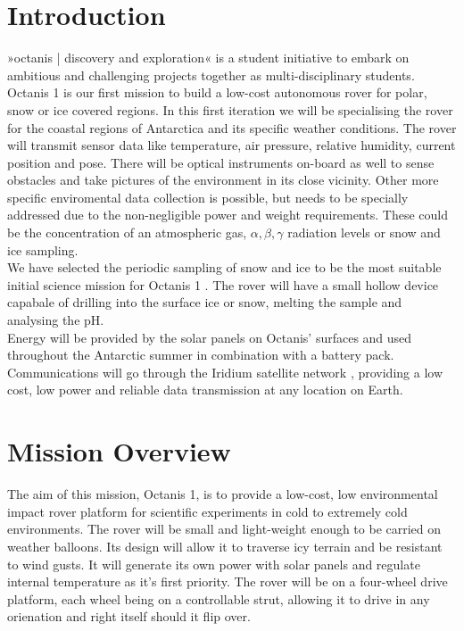 \documentclass[a4paper,12pt]{article}
\begin{document}
\section{Introduction}
»octanis | discovery and exploration« \cite{octanis} is a student initiative to embark on ambitious and challenging projects together as multi-disciplinary students. Octanis 1 is our first mission to build a low-cost autonomous rover for polar, snow or ice covered regions. In this first iteration we will be specialising the rover for the coastal regions of Antarctica and its specific weather conditions. The rover will transmit sensor data like temperature, air pressure, relative humidity, current position and pose. There will be optical instruments on-board as well to sense obstacles and take pictures of the environment in its close vicinity. Other more specific enviromental data collection is possible, but needs to be specially addressed due to the non-negligible power and weight requirements. These could be the concentration of an atmospheric gas, $\alpha, \beta, \gamma$ radiation levels or snow and ice sampling. \\ We have selected the periodic sampling of snow and ice to be the most suitable initial science mission for Octanis 1 \cite{krishnakant}. The rover will have a small hollow device capabale of drilling into the surface ice or snow, melting the sample and analysing the pH.
\\ Energy will be provided by the solar panels on Octanis' surfaces and used throughout the Antarctic summer in combination with a battery pack. Communications will go through the Iridium satellite network \cite{iridium}, providing a low cost, low power and reliable data transmission at any location on Earth. 



\section{Mission Overview}

The aim of this mission, Octanis 1, is to provide a low-cost, low environmental impact rover platform for scientific experiments in cold to extremely cold environments. The rover will be small and light-weight enough to be carried on weather balloons. Its design will allow it to traverse icy terrain and be resistant to wind gusts. It will generate its own power with solar panels and regulate internal temperature as it's first priority. The rover will be on a four-wheel drive platform, each wheel being on a controllable strut, allowing it to drive in any orienation and right itself should it flip over. 
\end{document}
